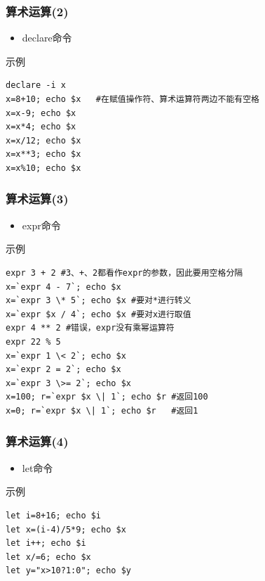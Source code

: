 \documentclass[xcolor=svgnames,presentation]{beamer}
\begin{document}
\begin{frame}[fragile]
\frametitle{算术运算(2)}
\label{sec-1-2-19}
\begin{itemize}

\item declare命令
\label{sec-1-2-19-1}%
\end{itemize} %
\begin{exampleblock}{示例}
\label{sec-1-2-19-2}


\begin{verbatim}
declare -i x
x=8+10; echo $x   #在赋值操作符、算术运算符两边不能有空格
x=x-9; echo $x
x=x*4; echo $x
x=x/12; echo $x
x=x**3; echo $x
x=x%10; echo $x
\end{verbatim}
\end{exampleblock}
\end{frame}
\begin{frame}[fragile]
\frametitle{算术运算(3)}
\label{sec-1-2-20}
\begin{itemize}

\item expr命令
\label{sec-1-2-20-1}%
\end{itemize} %
\begin{exampleblock}{示例}
\label{sec-1-2-20-2}


\begin{verbatim}
expr 3 + 2 #3、+、2都看作expr的参数，因此要用空格分隔
x=`expr 4 - 7`; echo $x
x=`expr 3 \* 5`; echo $x #要对*进行转义
x=`expr $x / 4`; echo $x #要对x进行取值
expr 4 ** 2 #错误，expr没有乘幂运算符
expr 22 % 5
x=`expr 1 \< 2`; echo $x
x=`expr 2 = 2`; echo $x
x=`expr 3 \>= 2`; echo $x
x=100; r=`expr $x \| 1`; echo $r #返回100
x=0; r=`expr $x \| 1`; echo $r   #返回1
\end{verbatim}
\end{exampleblock}
\end{frame}
\begin{frame}[fragile]
\frametitle{算术运算(4)}
\label{sec-1-2-21}
\begin{itemize}

\item let命令
\label{sec-1-2-21-1}%
\end{itemize} %
\begin{exampleblock}{示例}
\label{sec-1-2-21-2}


\begin{verbatim}
let i=8+16; echo $i
let x=(i-4)/5*9; echo $x
let i++; echo $i
let x/=6; echo $x
let y="x>10?1:0"; echo $y
\end{verbatim}
\end{exampleblock}
\end{frame}
\end{document}
